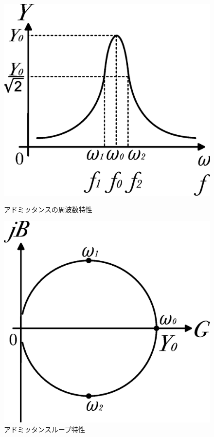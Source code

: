\documentclass[titlepage]{jsarticle}
\begin{document}
    \begin{figure}[h]
        \begin{minipage}{0.5\hsize}
            \centering
            \includegraphics[width=0.8\hsize]{images/admittance.eps}
            \caption{アドミッタンスの周波数特性}
            \label{fig:admittance_hz}
        \end{minipage}
        \begin{minipage}{0.5\hsize}
            \centering
            \includegraphics[width=0.8\hsize]{images/admittance_loop.eps}
            \caption{アドミッタンスループ特性}
            \label{fig:admittance_loop}
        \end{minipage}
    \end{figure}
\end{document}
